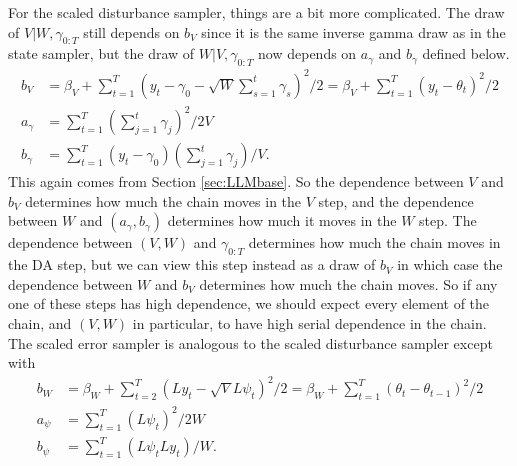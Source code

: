 \documentclass{article}
\begin{document}
For the scaled disturbance sampler, things are a bit more complicated. The draw of $V|W,\gamma_{0:T}$ still depends on $b_V$ since it is the same inverse gamma draw as in the state sampler, but the draw of $W|V,\gamma_{0:T}$ now depends on $a_\gamma$ and $b_\gamma$ defined below.
\begin{align*}
  b_V &= \beta_V + \sum_{t=1}^T\left(y_t - \gamma_0 - \sqrt{W}\sum_{s=1}^t\gamma_{s}\right)^2/2 = \beta_V + \sum_{t=1}^T(y_t - \theta_t)^2/2\\
  a_\gamma & = \sum_{t=1}^T(\sum_{j=1}^t\gamma_j)^2/2V\\
  b_\gamma &=\sum_{t=1}^T(y_t-\gamma_0)(\sum_{j=1}^t\gamma_j)/V.
\end{align*}
This again comes from Section \ref{sec:LLMbase}. So the dependence between $V$ and $b_V$ determines how much the chain moves in the $V$ step, and the dependence between $W$ and $(a_\gamma , b_\gamma)$ determines how much it moves in the $W$ step. The dependence between $(V,W)$ and $\gamma_{0:T}$ determines how much the chain moves in the DA step, but we can view this step instead as a draw of $b_V$ in which case the dependence between $W$ and $b_V$ determines how much the chain moves. So if any one of these steps has high dependence, we should expect every element of the chain, and $(V,W)$ in particular, to have high serial dependence in the chain. The scaled error sampler is analogous to the scaled disturbance sampler except with 
\begin{align*}
  b_W &= \beta_W + \sum_{t=2}^T(Ly_t - \sqrt{V}L\psi_t)^2/2 = \beta_W + \sum_{t=1}^T(\theta_t - \theta_{t-1})^2/2\\
  a_\psi&=\sum_{t=1}^T(L\psi_t)^2/2W\\
  b_\psi&=\sum_{t=1}^T(L\psi_tLy_t)/W.
\end{align*}
\end{document}
